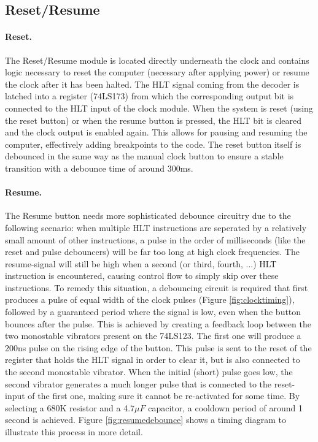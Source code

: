 \subsection{Reset/Resume} \label{sec:resetresume}
\paragraph{Reset.} The Reset/Resume module is located directly underneath the clock and contains logic necessary to reset the computer (necessary after applying power) or resume the clock after it has been halted. The HLT signal coming from the decoder is latched into a register (74LS173) from which the corresponding output bit is connected to the HLT input of the clock module. When the system is reset (using the reset button) or when the resume button is pressed, the HLT bit is cleared and the clock output is enabled again. This allows for pausing and resuming the computer, effectively adding breakpoints to the code. The reset button itself is debounced in the same way as the manual clock button to ensure a stable transition with a debounce time of around 300ms.

\paragraph{Resume.} The Resume button needs more sophisticated debounce circuitry due to the following scenario: when multiple HLT instructions are seperated by a relatively small amount of other instructions, a pulse in the order of milliseconds (like the reset and pulse debouncers) will be far too long at high clock frequencies. The resume-signal will still be high when a second (or third, fourth, ...) HLT instruction is encountered, causing control flow to simply skip over these instructions. To remedy this situation, a debouncing circuit is required that first produces a pulse of equal width of the clock pulses (Figure \ref{fig:clocktiming}), followed by a guaranteed period where the signal is low, even when the button bounces after the pulse. This is achieved by creating a feedback loop between the two monostable vibrators present on the 74LS123. The first one will produce a 200ns pulse on the rising edge of the button. This pulse is sent to the reset of the register that holds the HLT signal in order to clear it, but is also connected to the second monostable vibrator. When the initial (short) pulse goes low, the second vibrator generates a much longer pulse that is connected to the reset-input of the first one, making sure it cannot be re-activated for some time. By selecting a 680K resistor and a 4.7$\mu F$ capacitor, a cooldown period of around 1 second is achieved. Figure \ref{fig:resumedebounce} shows a timing diagram to illustrate this process in more detail. 

